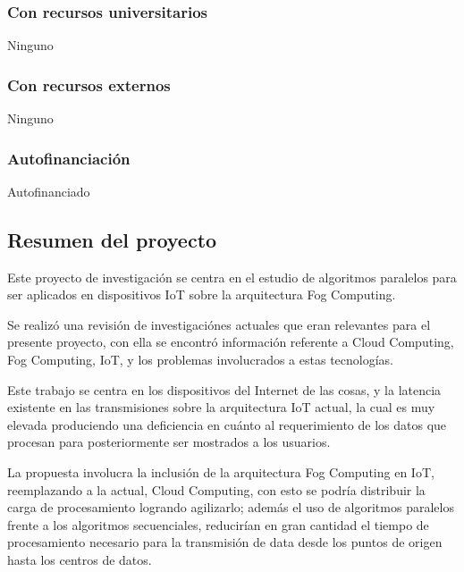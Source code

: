     \subsubsection{Con recursos universitarios}
        Ninguno
    \subsubsection{Con recursos externos}
        Ninguno
    \subsubsection{Autofinanciación}
        Autofinanciado

\subsection{Resumen del proyecto}
    Este proyecto de investigación se centra en el estudio de algoritmos paralelos para ser aplicados en dispositivos IoT sobre la arquitectura Fog Computing.\par
    Se realizó una revisión de investigaciónes actuales que eran relevantes para el presente proyecto, con ella se encontró información referente a Cloud Computing, Fog Computing, IoT, y los problemas involucrados a estas tecnologías.\par
    Este trabajo se centra en los dispositivos del Internet de las cosas, y la latencia existente en las transmisiones sobre la arquitectura IoT actual, la cual es muy elevada produciendo una deficiencia en cuánto al requerimiento de los datos que procesan para posteriormente ser mostrados a los usuarios.\par
    La propuesta involucra la inclusión de la arquitectura Fog Computing en IoT, reemplazando a la actual, Cloud Computing, con esto se podría distribuir la carga de procesamiento logrando agilizarlo; además el uso de algoritmos paralelos frente a los algoritmos secuenciales, reducirían en gran cantidad el tiempo de procesamiento necesario para la transmisión de data desde los puntos de origen hasta los centros de datos.\par
